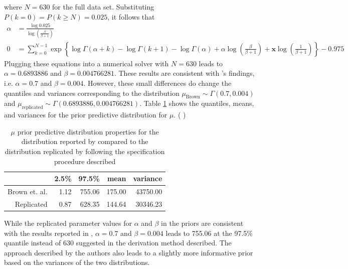 \documentclass{uwstat572}
\newcommand{\vmcomment}[1]{({\color{blue}{VM's comment:}} \textbf{\color{blue}{#1}})}
\begin{document}
where $N=630$ for the full data set. 
Substituting $P(k=0)=P(k \ge N)=0.025$, it follows that 
\begin{align*}
\alpha &= \frac{\log 0.025}{\log \left( \frac{\beta}{\beta+1} \right)} \\
0 &= \sum_{k=0}^{N-1} \exp \left\{ \log \Gamma(\alpha+k) - \log \Gamma(k+1) - \log \Gamma(\alpha) + \alpha \log \left(\frac{\beta}{\beta +1} \right) + \boldsymbol{x} \log \left(\frac{1}{\beta +1} \right) \right\} - 0.975
\end{align*}
Plugging these equations into a numerical solver with $N=630$ leads to $\alpha=0.6893886$ and $\beta=0.004766281$. 
These results are consistent with \citet{Brown}'s findings, i.e. $\alpha=0.7$ and $\beta=0.004$. 
However, these small differences do change the quantiles and variances corresponding to the distribution $\mu_{\text{Brown}} \sim \Gamma(0.7, 0.004)$ and $\mu_{\text{replicated}} \sim \Gamma(0.6893886, 0.004766281)$. 
Table \ref{table:mu_prior_quantile} shows the quantiles, means, and variances for the prior predictive distribution for $\mu$. 
\vmcomment{I would skip or move the above equations into the appendix. Poisson integrated against Gamma results in a Negative Binomial distribution, which is pretty standard. I would not dwell on this in the manuscript.}

\begin{table}[ht]
\centering
\begin{tabular}{rrrrr}
  \hline
 & 2.5\% & 97.5\% & mean & variance \\ 
  \hline
Brown et. al. & 1.12 & 755.06 & 175.00 & 43750.00 \\ 
  Replicated & 0.87 & 628.35 & 144.64 & 30346.23 \\ 
   \hline
\end{tabular}
\caption{$\mu$ prior predictive distribution properties for the distribution reported by \cite{Brown} compared to the distribution replicated by following the specification procedure described}
\label{table:mu_prior_quantile}
\end{table}

While the replicated parameter values for $\alpha$ and $\beta$ in the priors are consistent with the results reported in \citep{Brown}, $\alpha=0.7$ and $\beta=0.004$ leads to 755.06 at the 97.5\% quantile instead of 630 suggested in the derivation method described. 
The approach described by the authors also leads to a slightly more informative prior based on the variances of the two distributions. 
\end{document}
